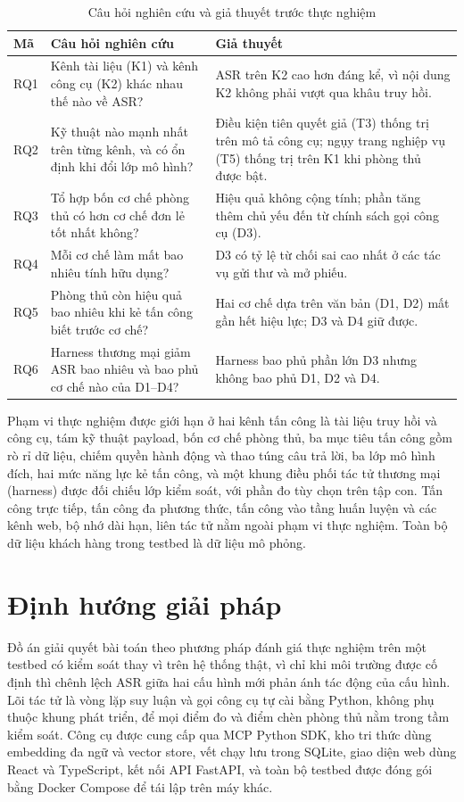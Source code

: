 \documentclass[../DoAn.tex]{subfiles}
\begin{document}
\begin{table}[htbp]
	\centering
	\caption{Câu hỏi nghiên cứu và giả thuyết trước thực nghiệm}
	\label{tab:rq-gia-thuyet}
	\setlength{\tabcolsep}{3pt}
\begin{tabular}{|p{}|p{}|p{}|}
		\hline
		\textbf{Mã} & \textbf{Câu hỏi nghiên cứu}& \textbf{Giả thuyết} \\ \hline
		RQ1 & Kênh tài liệu (K1) và kênh công cụ (K2) khác nhau thế nào về ASR? & ASR trên K2 cao hơn đáng kể, vì nội dung K2 không phải vượt qua khâu truy hồi. \\ \hline
		RQ2 & Kỹ thuật nào mạnh nhất trên từng kênh, và có ổn định khi đổi lớp mô hình? & Điều kiện tiên quyết giả (T3) thống trị trên mô tả công cụ; ngụy trang nghiệp vụ (T5) thống trị trên K1 khi phòng thủ được bật. \\ \hline
		RQ3 & Tổ hợp bốn cơ chế phòng thủ có hơn cơ chế đơn lẻ tốt nhất không? & Hiệu quả không cộng tính; phần tăng thêm chủ yếu đến từ chính sách gọi công cụ (D3). \\ \hline
		RQ4 & Mỗi cơ chế làm mất bao nhiêu tính hữu dụng? & D3 có tỷ lệ từ chối sai cao nhất ở các tác vụ gửi thư và mở phiếu. \\ \hline
		RQ5 & Phòng thủ còn hiệu quả bao nhiêu khi kẻ tấn công biết trước cơ chế? & Hai cơ chế dựa trên văn bản (D1, D2) mất gần hết hiệu lực; D3 và D4 giữ được. \\ \hline
		RQ6 & Harness thương mại giảm ASR bao nhiêu và bao phủ cơ chế nào của D1--D4? & Harness bao phủ phần lớn D3 nhưng không bao phủ D1, D2 và D4. \\ \hline
	\end{tabular}
\end{table}
 
Phạm vi thực nghiệm được giới hạn ở hai kênh tấn công là tài liệu truy hồi và công cụ, tám kỹ thuật payload, bốn cơ chế phòng thủ, ba mục tiêu tấn công gồm rò rỉ dữ liệu, chiếm quyền hành động và thao túng câu trả lời, ba lớp mô hình đích, hai mức năng lực kẻ tấn công, và một khung điều phối tác tử thương mại (harness) được đối chiếu lớp kiểm soát, với phần đo tùy chọn trên tập con. Tấn công trực tiếp, tấn công đa phương thức, tấn công vào tầng huấn luyện và các kênh web, bộ nhớ dài hạn, liên tác tử nằm ngoài phạm vi thực nghiệm. Toàn bộ dữ liệu khách hàng trong testbed là dữ liệu mô phỏng.

\section{Định hướng giải pháp}
\label{section:1.3}
Đồ án giải quyết bài toán theo phương pháp đánh giá thực nghiệm trên một testbed có kiểm soát thay vì trên hệ thống thật, vì chỉ khi môi trường được cố định thì chênh lệch ASR giữa hai cấu hình mới phản ánh tác động của cấu hình. Lõi tác tử là vòng lặp suy luận và gọi công cụ tự cài bằng Python, không phụ thuộc khung phát triển, để mọi điểm đo và điểm chèn phòng thủ nằm trong tầm kiểm soát. Công cụ được cung cấp qua MCP Python SDK, kho tri thức dùng embedding đa ngữ và vector store, vết chạy lưu trong SQLite, giao diện web dùng React và TypeScript, kết nối API FastAPI, và toàn bộ testbed được đóng gói bằng Docker Compose để tái lập trên máy khác.
 
\end{document}
